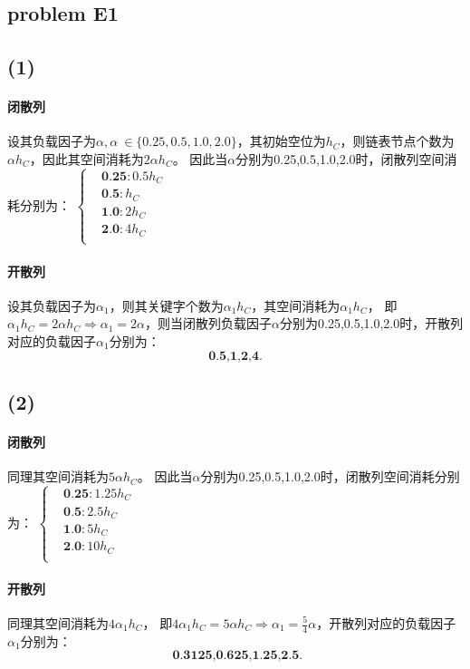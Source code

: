 \documentclass[11pt]{ctexart}
\begin{document}
	\subsection*{problem E1}
	\subsection*{(1)} 
	\paragraph{闭散列}设其负载因子为$\alpha,\alpha\ \in\{0.25,0.5,1.0,2.0\}$，其初始空位为$h_C$，则链表节点个数为$\alpha h_C$，因此其空间消耗为$2\alpha h_C$。
	因此当$\alpha$分别为0.25,0.5,1.0,2.0时，闭散列空间消耗分别为：
	$\left\{
	\begin{aligned}
	&\textbf{0.25}: 0.5h_C\\
	&\textbf{0.5}: h_C\\
	&\textbf{1.0}: 2h_C\\
	&\textbf{2.0}: 4h_C\\
	\end{aligned}
	\right.
	$
	\paragraph{开散列}设其负载因子为$\alpha_1$，则其关键字个数为$\alpha_1 h_C$，其空间消耗为$\alpha_1 h_C$，
	即$\alpha_1 h_C=2\alpha h_C\Rightarrow \alpha_1=2\alpha$，则当闭散列负载因子$\alpha$分别为0.25,0.5,1.0,2.0时，开散列对应的负载因子$\alpha_1$分别为：$$\textbf{0.5,1,2,4}.$$
	
	\subsection*{(2)}
	\paragraph{闭散列}同理其空间消耗为$5\alpha h_C$。
	因此当$\alpha$分别为0.25,0.5,1.0,2.0时，闭散列空间消耗分别为：
	$\left\{
	\begin{aligned}
	&\textbf{0.25}: 1.25h_C\\
	&\textbf{0.5}: 2.5h_C\\
	&\textbf{1.0}: 5h_C\\
	&\textbf{2.0}: 10h_C\\
	\end{aligned}
	\right.
	$
	\paragraph{开散列}同理其空间消耗为$4\alpha_1 h_C$，
	即$4\alpha_1 h_C=5\alpha h_C\Rightarrow \alpha_1=\frac{5}{4}\alpha$，开散列对应的负载因子$\alpha_1$分别为：$$\textbf{ 0.3125,0.625,1.25,2.5}.$$
\end{document}
